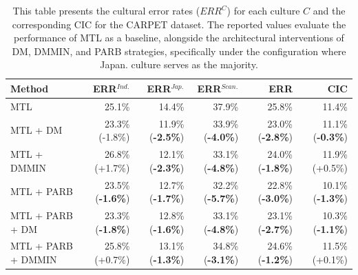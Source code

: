 \begin{table}
\centering
\scriptsize
\begin{tabular}{lrrrrr}
\toprule
\textbf{Method} & \textbf{ERR$^{Ind.}$} & \textbf{ERR$^{Jap.}$} & \textbf{ERR$^{Scan.}$} & \textbf{ERR} & \textbf{CIC} \\
\midrule
MTL          & 25.1\% & 14.4\% & 37.9\% & 25.8\% & 11.4\% \\
MTL + DM     & 23.3\% (-1.8\%) & 11.9\% (\textbf{-2.5\%}) & 33.9\% (\textbf{-4.0\%}) & 23.0\% (\textbf{-2.8\%}) & 11.1\% (\textbf{-0.3\%}) \\
MTL +  DMMIN & 26.8\% (+1.7\%) & 12.1\% (\textbf{-2.3\%}) & 33.1\% (\textbf{-4.8\%}) & 24.0\% (\textbf{-1.8\%}) & 11.9\% (+0.5\%) \\
\hline
MTL + PARB     & 23.5\% (\textbf{-1.6\%}) & 12.7\% (\textbf{-1.7\%}) & 32.2\% (\textbf{-5.7\%}) & 22.8\% (\textbf{-3.0\%}) & 10.1\% (\textbf{-1.3\%})  \\
MTL + PARB + DM & 23.3\% (\textbf{-1.8\%}) & 12.8\% (\textbf{-1.6\%}) & 33.1\% (\textbf{-4.8\%}) & 23.1\% (\textbf{-2.7\%}) & 10.3\% (\textbf{-1.1\%}) \\
MTL + PARB + DMMIN & 25.8\% (+0.7\%) & 13.1\% (\textbf{-1.3\%}) & 34.8\% (\textbf{-3.1\%}) & 24.6\% (\textbf{-1.2\%}) & 11.5\% (+0.1\%) \\
\bottomrule
\end{tabular}
\caption{This table presents the cultural error rates ($ERR^C$) for each culture $C$ and the corresponding CIC for the CARPET dataset. The reported values evaluate the performance of MTL as a baseline, alongside the architectural interventions of DM, DMMIN, and PARB strategies, specifically under the configuration where Japan. culture serves as the majority.}
\label{ch3:tab:mtl_and_da:CJ}
\end{table}
%
%
